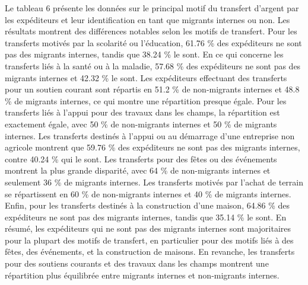 \documentclass[a4paper,12pt]{article}
\begin{document}
Le tableau 6 présente les données sur le principal motif du transfert d'argent par les expéditeurs et leur identification en tant que migrants internes ou non. Les résultats montrent des différences notables selon les motifs de transfert.
Pour les transferts motivés par la scolarité ou l’éducation, 61.76 \% des expéditeurs ne sont pas des migrants internes, tandis que 38.24 \% le sont. En ce qui concerne les transferts liés à la santé ou à la maladie, 57.68 \% des expéditeurs ne sont pas des migrants internes et 42.32 \% le sont.
Les expéditeurs effectuant des transferts pour un soutien courant sont répartis en 51.2 \% de non-migrants internes et 48.8 \% de migrants internes, ce qui montre une répartition presque égale. Pour les transferts liés à l'appui pour des travaux dans les champs, la répartition est exactement égale, avec 50 \% de non-migrants internes et 50 \% de migrants internes.
Les transferts destinés à l'appui ou au démarrage d’une entreprise non agricole montrent que 59.76 \% des expéditeurs ne sont pas des migrants internes, contre 40.24 \% qui le sont. Les transferts pour des fêtes ou des événements montrent la plus grande disparité, avec 64 \% de non-migrants internes et seulement 36 \% de migrants internes.
Les transferts motivés par l'achat de terrain se répartissent en 60 \% de non-migrants internes et 40 \% de migrants internes. Enfin, pour les transferts destinés à la construction d’une maison, 64.86 \% des expéditeurs ne sont pas des migrants internes, tandis que 35.14 \% le sont.
En résumé, les expéditeurs qui ne sont pas des migrants internes sont majoritaires pour la plupart des motifs de transfert, en particulier pour des motifs liés à des fêtes, des événements, et la construction de maisons. En revanche, les transferts pour des soutiens courants et des travaux dans les champs montrent une répartition plus équilibrée entre migrants internes et non-migrants internes.
\end{document}
